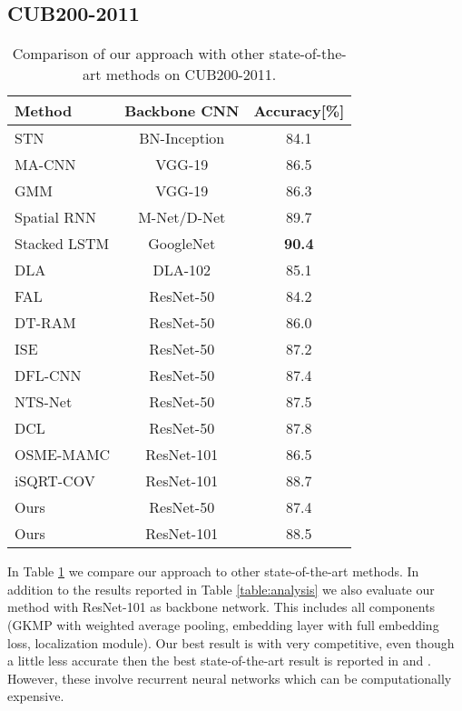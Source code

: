 \documentclass[10pt,twocolumn,letterpaper]{article}
\begin{document}
\subsection{CUB200-2011}
\label{section:birds}
\begin{table}[h]
  \begin{center}
  \begin{tabular} {|l|c|c|}
    \hline
    Method & Backbone CNN & Accuracy[\%] \\
    \hline
    \hline
    STN \cite{jaderberg2015spatial} & BN-Inception & 84.1 \\
    MA-CNN \cite{zheng2017learning} & VGG-19 &  86.5 \\
    GMM \cite{liang2018gmm} & VGG-19 &  86.3 \\
    Spatial RNN \cite{wu2018deep} & M-Net/D-Net & 89.7\\
    Stacked LSTM \cite{Ge_2019_CVPR} & GoogleNet & \bf{90.4} \\
    DLA \cite{yu2018deep} & DLA-102 & 85.1 \\
    FAL \cite{xu2018attend} & ResNet-50 & 84.2 \\
    DT-RAM \cite{li2017dynamic} & ResNet-50 & 86.0 \\
    ISE \cite{simonelli2018increasingly} & ResNet-50 & 87.2 \\ 
    DFL-CNN \cite{wang2018learning} & ResNet-50 &  87.4 \\
    NTS-Net \cite{yang2018learning} & ResNet-50 &  87.5 \\
    DCL \cite{Chen_2019_CVPR} & ResNet-50 & 87.8 \\
    OSME-MAMC \cite{sun2018multi} & ResNet-101 & 86.5 \\
    iSQRT-COV \cite{li2018towards} & ResNet-101 & 88.7 \\
    \hline
    Ours   & ResNet-50  &  87.4 \\
    Ours   & ResNet-101 &  88.5 \\
    \hline
  \end{tabular}
  \end{center}
  \caption{Comparison of our approach with other state-of-the-art methods on CUB200-2011.}
  \label{table:birds}
\end{table}

In Table \ref{table:birds} we compare our approach to other state-of-the-art methods. In addition to the results reported in Table \ref{table:analysis} we also evaluate our method with ResNet-101 as backbone network. This includes all components (GKMP with weighted average pooling, embedding layer with full embedding loss, localization module). Our best result is with  very competitive, even though a little less accurate then the best state-of-the-art result is reported in \cite{wu2018deep} and \cite{Ge_2019_CVPR}. However, these involve recurrent neural networks which can be computationally expensive. 
\end{document}
